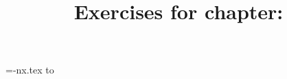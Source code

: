 \documentclass{artikel3}
\newcounter{chapter}
\begin{document}
\begin{raggedright}

\title{Exercises for chapter: \chaptershorttitle}
\author{}\date{}\maketitle


\newread\nx
\openin\nx=\chaptername-nx.tex
\read\nx to \nex
\closein\nx

\repeat {} \to{\nex}

\end{raggedright}
\end{document}
